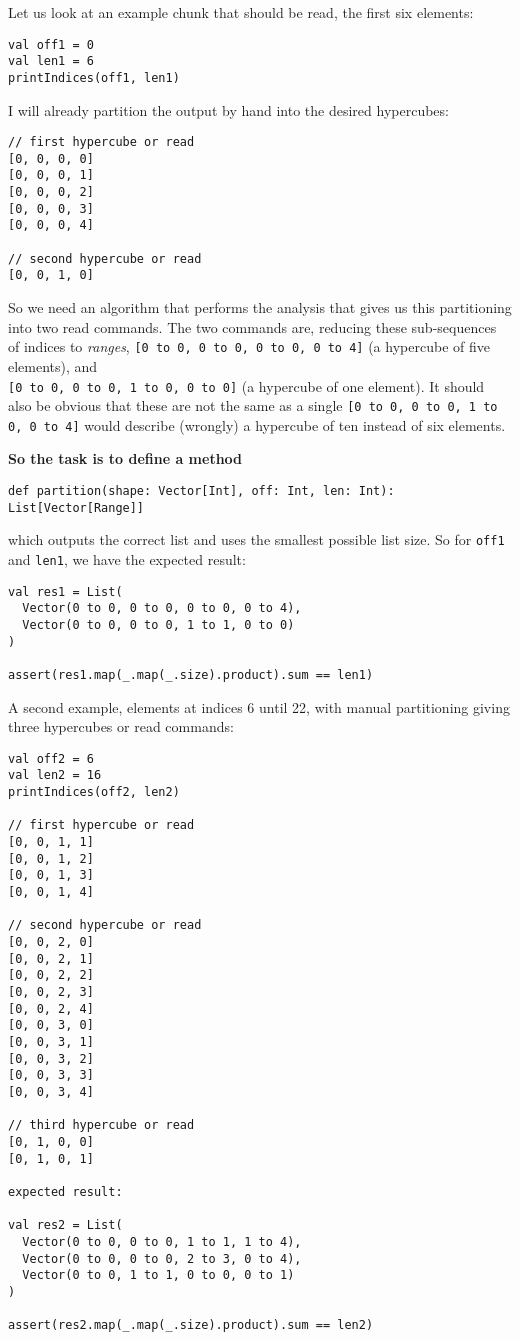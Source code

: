 \documentclass[11pt,a4paper]{article}
\begin{document}
Let us look at an example chunk that should be read,
the first six elements:
%
\begin{lstlisting}[style=scala]
val off1 = 0
val len1 = 6
printIndices(off1, len1)
\end{lstlisting}
%
I will already partition the output by hand into the desired hypercubes:
%
\begin{lstlisting}[style=scala]
// first hypercube or read
[0, 0, 0, 0]
[0, 0, 0, 1]
[0, 0, 0, 2]
[0, 0, 0, 3]
[0, 0, 0, 4]

// second hypercube or read
[0, 0, 1, 0]
\end{lstlisting}
%
So we need an algorithm that performs the analysis that gives us this partitioning into two read commands. The two commands are, reducing these sub-sequences of indices to \emph{ranges}, \Verb![0 to 0, 0 to 0, 0 to 0, 0 to 4]! (a hypercube of five elements), and\\
\Verb![0 to 0, 0 to 0, 1 to 0, 0 to 0]! (a hypercube of one element). It should also be obvious that these are not the same as a single \Verb![0 to 0, 0 to 0, 1 to 0, 0 to 4]! would describe (wrongly) a hypercube of ten instead of six elements.

\textbf{So the task is to define a method}
%
\begin{lstlisting}[style=scala]
def partition(shape: Vector[Int], off: Int, len: Int): List[Vector[Range]]
\end{lstlisting}
%
which outputs the correct list and uses the smallest possible list size.
So for \Verb!off1! and \Verb!len1!, we have the expected result:
%
\begin{lstlisting}[style=scala]
val res1 = List(
  Vector(0 to 0, 0 to 0, 0 to 0, 0 to 4),
  Vector(0 to 0, 0 to 0, 1 to 1, 0 to 0)
)
    
assert(res1.map(_.map(_.size).product).sum == len1)
\end{lstlisting}
%
A second example, elements at indices 6 until 22, with manual partitioning giving three hypercubes or read commands:
%
\begin{lstlisting}[style=scala]
val off2 = 6
val len2 = 16
printIndices(off2, len2)

// first hypercube or read
[0, 0, 1, 1]
[0, 0, 1, 2]
[0, 0, 1, 3]
[0, 0, 1, 4]

// second hypercube or read
[0, 0, 2, 0]
[0, 0, 2, 1]
[0, 0, 2, 2]
[0, 0, 2, 3]
[0, 0, 2, 4]
[0, 0, 3, 0]
[0, 0, 3, 1]
[0, 0, 3, 2]
[0, 0, 3, 3]
[0, 0, 3, 4]

// third hypercube or read
[0, 1, 0, 0]
[0, 1, 0, 1]

expected result:

val res2 = List(
  Vector(0 to 0, 0 to 0, 1 to 1, 1 to 4),
  Vector(0 to 0, 0 to 0, 2 to 3, 0 to 4),
  Vector(0 to 0, 1 to 1, 0 to 0, 0 to 1)
)

assert(res2.map(_.map(_.size).product).sum == len2)
\end{lstlisting}
\end{document}
